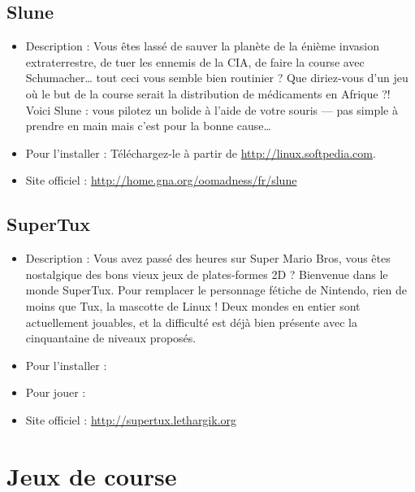 \subsection{Slune}
\begin{itemize}
\begingroup
{}
\item Description : Vous êtes lassé de sauver la planète de la énième invasion extraterrestre, de tuer les ennemis de la CIA, de faire la course avec Schumacher\ldots{} tout ceci vous semble bien routinier ? Que diriez-vous d'un jeu où le but de la course serait la distribution de médicaments en Afrique ?! Voici Slune : vous pilotez un bolide à l'aide de votre souris --- pas simple à prendre en main mais c'est pour la bonne cause\ldots{}{\par}
\endgroup
\item Pour l'installer : Téléchargez-le à partir de \url{http://linux.softpedia.com}.{\par}
\item Site officiel : \url{http://home.gna.org/oomadness/fr/slune}{\par}
\end{itemize}
\subsection{SuperTux}
\begin{itemize}
\begingroup
{}
\item Description : Vous avez passé des heures sur Super Mario Bros, vous êtes nostalgique des bons vieux jeux de plates-formes 2D ? Bienvenue dans le monde SuperTux. Pour remplacer le personnage fétiche de Nintendo, rien de moins que Tux, la mascotte de Linux ! Deux mondes en entier sont actuellement jouables, et la difficulté est déjà bien présente avec la cinquantaine de niveaux proposés.{\par}
\item Pour l'installer : 
\item Pour jouer : 
\item Site officiel : \url{http://supertux.lethargik.org}{\par}
\endgroup
\end{itemize}
\section{Jeux de course}
